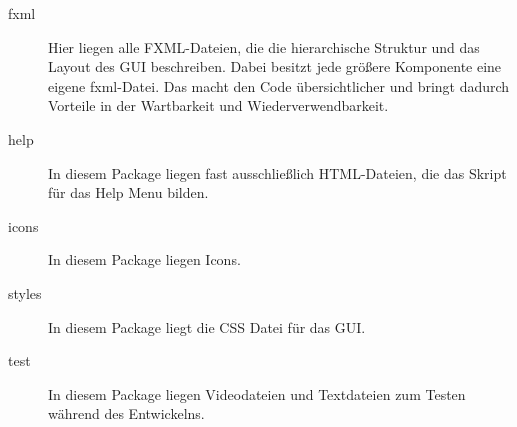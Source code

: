 \begin{description}
	\item [fxml] Hier liegen alle FXML-Dateien, die die hierarchische Struktur und das Layout des GUI beschreiben. Dabei besitzt jede größere Komponente eine eigene fxml-Datei. Das macht den Code übersichtlicher und bringt dadurch Vorteile in der Wartbarkeit und Wiederverwendbarkeit.
	\item [help] In diesem Package liegen fast ausschließlich HTML-Dateien, die das Skript für das Help Menu bilden.
	\item [icons] In diesem Package liegen Icons.
	\item [styles] In diesem Package liegt die CSS Datei für das GUI.
	\item [test] In diesem Package liegen Videodateien und Textdateien zum Testen während des Entwickelns.
\end{description}